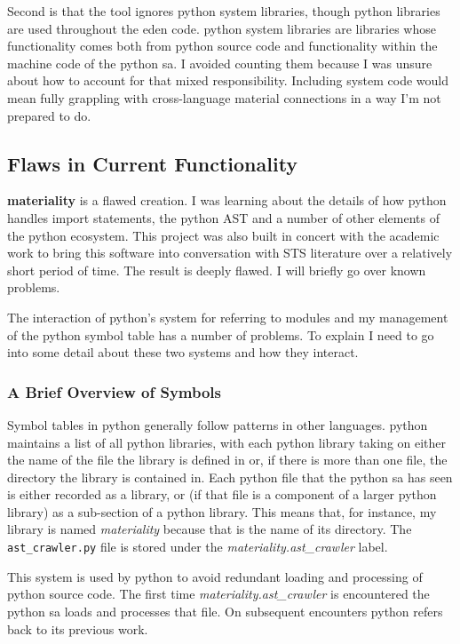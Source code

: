 \documentclass[a4paper,man,natbib,floatsintext]{apa6}
\begin{document}
  Second is that the tool ignores \Gls{python} system libraries, though \Gls{python} libraries are used throughout the \acrshort{eden} code. \Gls{python} system libraries are libraries whose functionality comes both from \Gls{python} source code and functionality within the machine code of the \Gls{python} \gls{sa}. I avoided counting them because I was unsure about how to account for that mixed responsibility. Including system code would mean fully grappling with cross-language material connections in a way I'm not prepared to do.

  \subsection{Flaws in Current Functionality}
  \textbf{materiality} is a flawed creation. I was learning about the details of how \Gls{python} handles import statements, the \Gls{python} AST and a number of other elements of the \Gls{python} ecosystem. This project was also built in concert with the academic work to bring this software into conversation with STS literature over a relatively short period of time. The result is deeply flawed. I will briefly go over known problems.

  The interaction of \Gls{python}'s system for referring to modules and my management of the \Gls{python} symbol table has a number of problems. To explain I need to go into some detail about these two systems and how they interact.

  \subsubsection{A Brief Overview of Symbols}
  Symbol tables in \Gls{python} generally follow patterns in other languages. \Gls{python} maintains a list of all \Gls{python} libraries, with each \Gls{python} library taking on either the name of the file the library is defined in or, if there is more than one file, the directory the library is contained in. Each \Gls{python} file that the \Gls{python} \gls{sa} has seen is either recorded as a library, or (if that file is a component of a larger python library) as a sub-section of a \Gls{python} library. This means that, for instance, my library is named \textit{materiality} because that is the name of its directory. The \verb|ast_crawler.py| file is stored under the \textit{materiality.ast\_crawler} label.

  This system is used by \Gls{python} to avoid redundant loading and processing of \Gls{python} source code. The first time \textit{materiality.ast\_crawler} is encountered the \Gls{python} \gls{sa} loads and processes that file. On subsequent encounters \Gls{python} refers back to its previous work. 
\end{document}

